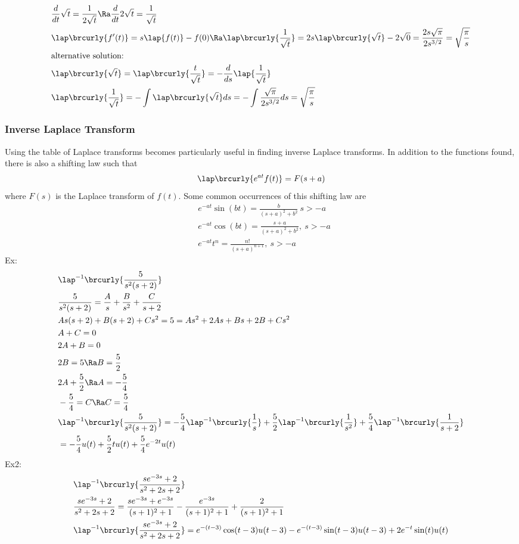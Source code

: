 \begin{align*}
    &\frac{d}{dt}\sqrt{t}=\frac{1}{2\sqrt{t}}\Ra \frac{d}{dt}2\sqrt{t}=\frac{1}{\sqrt{t}}\\
    &\lap\brcurly{f'(t)}=s\lap{f(t)}-f(0)\Ra \lap\brcurly{\frac{1}{\sqrt{t}}}=2s\lap\brcurly{\sqrt{t}}-2\sqrt{0}=\frac{2s\sqrt{\pi}}{2s^{3/2}}=\sqrt{\frac{\pi}{s}}\\
    &\text{alternative solution:}\\
    &\lap\brcurly{\sqrt{t}}=\lap\brcurly{\frac{t}{\sqrt{t}}}=-\frac{d}{ds}\lap{\frac{1}{\sqrt{t}}}\\
    &\lap\brcurly{\frac{1}{\sqrt{t}}}=-\int \lap\brcurly{\sqrt{t}}ds=-\int\frac{\sqrt{\pi}}{2s^{3/2}}ds=\sqrt{\frac{\pi}{s}}
\end{align*}
\subsubsection{Inverse Laplace Transform}
Using the table of Laplace transforms becomes particularly useful in finding inverse Laplace transforms. In addition to the functions found, there is also a shifting law such that
$$\lap\brcurly{e^{at}f(t)}=F(s+a)$$
where $F(s)$ is the Laplace transform of $f(t)$.
Some common occurrences of this shifting law are
\begin{align*}
    &e^{-at}\sin(bt)=\frac{b}{(s+a)^2+b^2}\ s>-a\\
    &e^{-at}\cos(bt)=\frac{s+a}{(s+a)^2+b^2},\ s>-a\\
    &e^{-at}t^n=\frac{n!}{(s+a)^{n+1}},\ s>-a
\end{align*}
Ex:
\begin{align*}
    &\lap^{-1}\brcurly{\frac{5}{s^2(s+2)}}\\
    &\frac{5}{s^2(s+2)}=\frac{A}{s}+\frac{B}{s^2}+\frac{C}{s+2}\\
    &As(s+2)+B(s+2)+Cs^2=5=As^2+2As+Bs+2B+Cs^2\\
    &A+C=0\\
    &2A+B=0\\
    &2B=5\Ra B=\frac{5}{2}\\
    &2A+\frac{5}{2}\Ra A=-\frac{5}{4}\\
    &-\frac{5}{4}=C\Ra C=\frac{5}{4}\\
    &\lap^{-1}\brcurly{\frac{5}{s^2(s+2)}}=-\frac{5}{4}\lap^{-1}\brcurly{\frac{1}{s}}+\frac{5}{2}\lap^{-1}\brcurly{\frac{1}{s^2}}+\frac{5}{4}\lap^{-1}\brcurly{\frac{1}{s+2}}\\
    &=-\frac{5}{4}u(t)+\frac{5}{2}tu(t)+\frac{5}{4}e^{-2t}u(t)
\end{align*}
Ex2:
\begin{align*}
    &\lap^{-1}\brcurly{\frac{se^{-3s}+2}{s^2+2s+2}}\\
    &\frac{se^{-3s}+2}{s^2+2s+2}=\frac{se^{-3s}+e^{-3s}}{(s+1)^2+1}-\frac{e^{-3s}}{(s+1)^2+1}+\frac{2}{(s+1)^2+1}\\
    &\lap^{-1}\brcurly{\frac{se^{-3s}+2}{s^2+2s+2}}=e^{-(t-3)}\cos(t-3)u(t-3)-e^{-(t-3)}\sin(t-3)u(t-3)+2e^{-t}\sin(t)u(t)
\end{align*}

